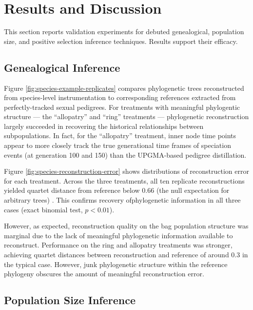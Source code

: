 \section{Results and Discussion} \label{sec:results}

This section reports validation experiments for debuted genealogical, population size, and positive selection inference techniques.
Results support their efficacy.

\subsection{Genealogical Inference}



Figure \ref{fig:species-example-replicates} compares phylogenetic trees reconstructed from species-level instrumentation to corresponding references extracted from perfectly-tracked sexual pedigrees.
For treatments with meaningful phylogentic structure --- the ``allopatry'' and ``ring'' treatments --- phylogenetic reconstruction largely succeeded in recovering the historical relationships between subpopulations.
In fact, for the ``allopatry'' treatment, inner node time points appear to more closely track the true generational time frames of speciation events (at generation 100 and 150) than the UPGMA-based pedigree distillation.

Figure \ref{fig:species-reconstruction-error} shows distributions of reconstruction error for each treatment.
Across the three treatments, all ten replicate reconstructions yielded quartet distance from reference below 0.66 (the null expectation for arbitrary trees) \citep{smith2020information}.
This confirms recovery ofphylogenetic information in all three cases (exact binomial test, $p < 0.01$).

However, as expected, reconstruction quality on the bag population structure was marginal due to the lack of meaningful phylogenetic information available to reconstruct.
Performance on the ring and allopatry treatments was stronger, achieving quartet distances between reconstruction and reference of around 0.3 in the typical case.
However, junk phylogenetic structure within the reference phylogeny obscures the amount of meaningful reconstruction error.

\subsection{Population Size Inference}


